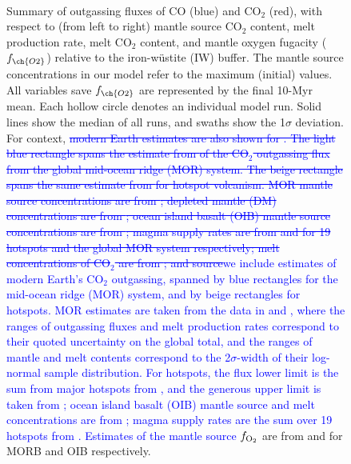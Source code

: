 \documentclass[3p,authoryear]{elsarticle}
\newcommand{\editthree}[2]{\textcolor{blue}{\sout{#1}#2}}
\begin{document}
\begin{figure}
\captionsetup[subfigure]{labelformat=empty}
\centering
     \\
\caption{\label{fig:summary_C}%
Summary of outgassing fluxes of CO (blue) and CO$_2$ (red), with respect to (from left to right) mantle source CO$_2$ content, melt production rate, melt CO$_2$ content, and mantle oxygen fugacity ($f_{\ch{O2}}$) relative to the iron-w\"ustite (IW) buffer. The mantle source concentrations in our model refer to the maximum (initial) values. All variables save $f_{\ch{O2}}$ are represented by the final 10-Myr mean. Each hollow circle denotes an individual model run. Solid lines show the median of all runs, and swaths show the 1$\sigma$ deviation. For context, \editthree{modern Earth estimates are also shown for . The light blue rectangle spans the estimate from \citet{Hauri2017} of the CO$_2$ outgassing flux from the global mid-ocean ridge (MOR) system. The beige rectangle spans the same estimate from \citet{DASGUPTA2010} for hotspot volcanism. MOR mantle source concentrations are from \citet{Hauri2017}; depleted mantle (DM) concentrations are from \citet{Marty2012}; ocean island basalt (OIB) mantle source concentrations are from \citet{Hauri2019}; magma supply rates are from \citet{Mjelde2010} and \citet{Cogne2006} for 19 hotspots and the global MOR system respectively; melt concentrations of CO$_2$ are from \citet{Hauri2019}; and source}{we include estimates of modern Earth's CO$_2$ outgassing, spanned by blue rectangles for the mid-ocean ridge (MOR) system, and by beige rectangles for hotspots. MOR estimates are taken from the data in \citet{Voyer2019} and \citet{Hauri2019}, where the ranges of outgassing fluxes and melt production rates correspond to their quoted uncertainty on the global total, and the ranges of mantle and melt contents correspond to the 2$\sigma$-width of their log-normal sample distribution. For hotspots, the \ch{CO2} flux lower limit is the sum from major hotspots from \citet{Hauri2019}, and the generous upper limit is taken from \citet{Marty1998}; ocean island basalt (OIB) mantle source and melt concentrations are from \citet{Hauri2019}; magma supply rates are the sum over 19 hotspots from \citet{Mjelde2010}. Estimates of the mantle source} $f_{\rm O_2}$ are from \citet{ONEILL2018} and \citet{AMUNDSEN1992} for MORB and OIB respectively. %
}
\end{figure}
\end{document}
